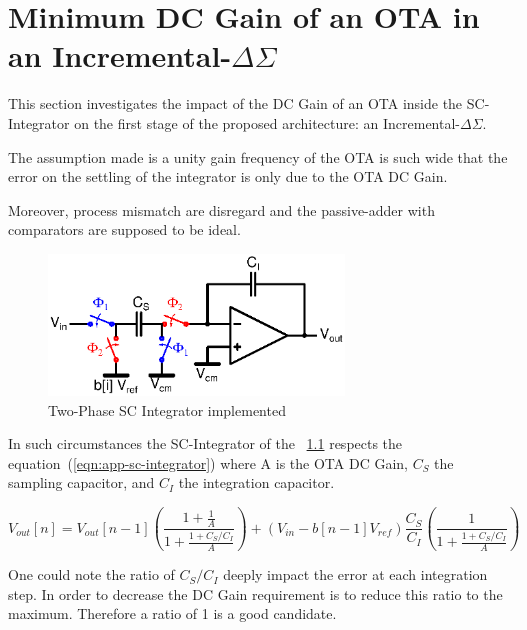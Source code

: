 
\chapter{Minimum DC Gain of an OTA in an Incremental-\(\Delta\Sigma \)}
\label{app:integrator-inl}

This section investigates the impact of the DC Gain of an OTA inside the SC-Integrator on the first stage of the proposed architecture: an Incremental-\(\Delta\Sigma \).

The assumption made is a unity gain frequency of the OTA is such wide that the error on the settling of the integrator is only due to the OTA DC Gain.

Moreover, process mismatch are disregard and the passive-adder with comparators are supposed to be ideal.

\begin{figure}[htp]
    \centering
    \includegraphics[width=0.7\textwidth]{Appendix2/sc-integrator.ps}
    \caption{Two-Phase SC Integrator implemented}
    \label{fig:app-sc-integrator}
\end{figure}

In such circumstances the SC-Integrator of the \figurename~\ref{fig:app-sc-integrator} respects the equation~(\ref{eqn:app-sc-integrator}) where A is the OTA DC Gain, \(C_S \) the sampling capacitor, and \(C_I \) the integration capacitor.

\begin{equation}
    \label{eqn:app-sc-integrator}
    V_{out}[n] = V_{out}[n-1] \left(\frac{1+\frac{1}{A}}{1+\frac{1+C_S/C_I}{A}}\right) + (V_{in}-b[n-1]V_{ref})\frac{C_S}{C_I}\left(\frac{1}{1+\frac{1+C_S/C_I}{A}}\right)
\end{equation}

One could note the ratio of \(C_S/C_I \) deeply impact the error at each integration step. In order to decrease the DC Gain requirement is to reduce this ratio to the maximum. Therefore a ratio of 1 is a good candidate.

